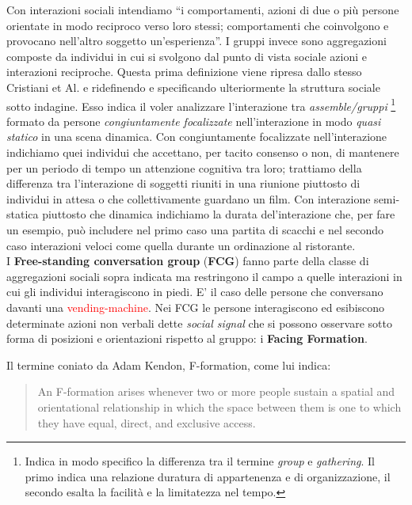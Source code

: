 \documentclass[8pt,twocolumn]{article}
\begin{document}
	Con interazioni sociali intendiamo \enquote{i comportamenti, azioni di due o più persone orientate in modo reciproco verso loro stessi; comportamenti che coinvolgono e provocano nell'altro soggetto un'esperienza}. I gruppi invece sono aggregazioni composte da individui in cui si svolgono dal punto di vista sociale azioni e interazioni reciproche. Questa prima definizione viene ripresa dallo stesso Cristiani et Al.\cite{Cristani:BMVC11} e ridefinendo e specificando ulteriormente la struttura sociale sotto indagine. Esso indica il voler analizzare l'interazione tra \textit{assemble/gruppi} \footnote{Indica in modo specifico la differenza tra il termine \textit{group} e \textit{gathering}.	Il primo indica una relazione duratura di appartenenza e di organizzazione, il secondo esalta la facilità e la limitatezza nel tempo.} formato da persone \textit{congiuntamente focalizzate} nell'interazione in modo \textit{quasi statico} in una scena dinamica. Con congiuntamente focalizzate nell'interazione indichiamo quei individui che accettano, per tacito consenso o non, di mantenere per un periodo di tempo un attenzione cognitiva tra loro; trattiamo della differenza tra l'interazione di soggetti riuniti in una riunione piuttosto di individui in attesa o che collettivamente guardano un film. Con interazione semi-statica piuttosto che dinamica indichiamo la durata del'interazione che, per fare un esempio, può includere nel primo caso una partita di scacchi e nel secondo caso interazioni veloci come quella durante un ordinazione al ristorante.\\
	
	I \textbf{Free-standing conversation group} (\textbf{FCG}) fanno parte della classe di aggregazioni sociali sopra indicata ma restringono il campo a quelle interazioni in cui gli individui interagiscono in piedi. E' il caso delle persone che conversano davanti una \textcolor{red}{vending-machine}. Nei FCG le persone interagiscono ed esibiscono determinate azioni non verbali dette \textit{social signal} che si possono osservare sotto forma di posizioni e orientazioni rispetto al gruppo: i \textbf{Facing Formation}.
	
	Il termine coniato da Adam Kendon\cite{kendon1990conducting}, F-formation, come lui indica:
	\begin{quote}
	    An F-formation arises whenever two or more people sustain a spatial and orientational relationship in which the space between them is one to which they have equal, direct, and exclusive access.
	\end{quote}
	
\end{document}
